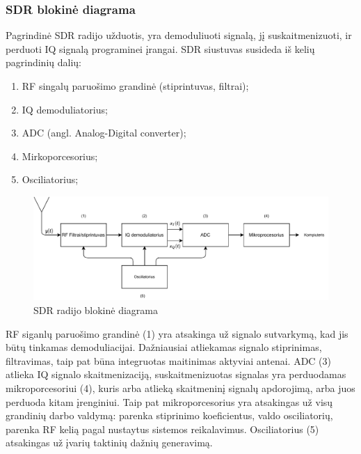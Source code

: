 \documentclass[main.tex]{subfiles}
\begin{document}
\subsubsection{SDR blokinė diagrama}

Pagrindinė SDR radijo užduotis, yra demoduliuoti signalą, jį suskaitmenizuoti, ir perduoti
IQ signalą programinei įrangai. SDR siustuvas susideda iš kelių pagrindinių dalių:

\begin{enumerate}
    \item RF singalų paruošimo grandinė (stiprintuvas, filtrai);
    \item IQ demoduliatorius;
    \item ADC (angl. Analog-Digital converter);
    \item Mirkoporcesorius;
    \item Osciliatorius;
\end{enumerate}

\begin{figure}[h]
    \begin{centering}
    \includegraphics[scale=0.85]{drawings/sdr_blockdiagram}
    \par\end{centering}
    \protect\caption{\label{fig:sdr_blockdiagram}SDR radijo blokinė diagrama}
\end{figure}

RF siganlų paruošimo grandinė (1) yra atsakinga už signalo sutvarkymą, kad jis
būtų tinkamas demoduliacijai. Dažniausiai atliekamas signalo stiprinimas,
filtravimas, taip pat būna integruotas maitinimas aktyviai antenai. ADC (3) atlieka IQ
signalo skaitmenizaciją, suskaitmenizuotas signalas yra perduodamas mikroporcesoriui (4),
kuris arba atlieką skaitmeninį signalų apdorojimą, arba juos perduoda kitam įrenginiui.
Taip pat mikroporcesorius yra atsakingas už visų grandinių darbo valdymą: parenka stiprinimo
koeficientus, valdo osciliatorių, parenka RF kelią pagal nustaytus sistemos reikalavimus.
Osciliatorius (5) atsakingas už įvarių taktinių dažnių generavimą.
\end{document}
